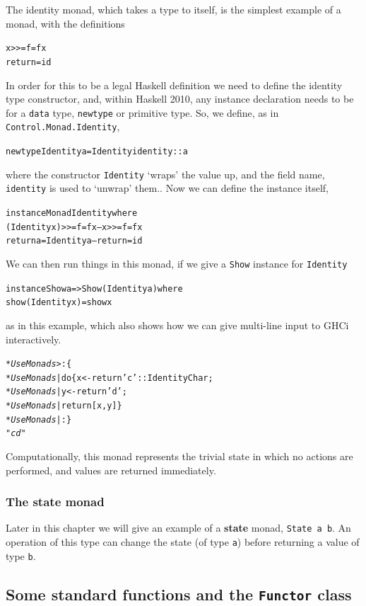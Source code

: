 The identity monad, which takes a type to itself, is the simplest
example of a monad, with the definitions
\begin{alltt}
x >>= f = f x 
return = id
\end{alltt}
In order for this to be a legal Haskell definition we need to define the identity type constructor, and, within Haskell 2010, any instance declaration needs to be for a \texttt{data} type, \texttt{newtype} or primitive type. So, we define, as in \texttt{Control.Monad.Identity},   
\begin{alltt}
newtype Identity a = Identity { identity :: a }
\end{alltt}
where the constructor \texttt{Identity} `wraps' the value up, and the field name, \texttt{identity} is used to `unwrap' them.. Now we can define the instance itself,
\begin{alltt} 
instance Monad Identity where
    (Identity x) >>= f = f x          --  x >>= f = f x 
    return a           = Identity a   --  return = id 
\end{alltt}
We can then run things in this monad, if we give a \texttt{Show} instance for \texttt{Identity}
\begin{alltt}
instance Show a => Show (Identity a) where
    show (Identity x) = show x
\end{alltt}
as in this example, which also shows how we can give multi-line input to GHCi interactively.
\begin{alltt}
\textsl{*UseMonads>} :\{
\textsl{*UseMonads}| do \{ x <- return 'c' :: Identity Char;
\textsl{*UseMonads}|      y <- return 'd';
\textsl{*UseMonads}|      return [x,y] \}
\textsl{*UseMonads}| :\}
\textsl{"cd"}
\end{alltt}
Computationally, this monad represents the trivial state in which no
actions are performed, and values are returned immediately.




\subsubsection*{The state monad}

Later in this chapter we will give an example of a \textbf{state} monad, 
\texttt{State a b}. An operation of this type can change the state (of type 
\texttt{a}) before returning
a value of type \texttt{b}.





\subsection*{Some standard functions and the \texttt{Functor} class}

